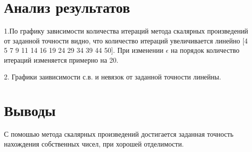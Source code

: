 \documentclass{article}
\begin{document}
	
	\section{Анализ результатов}
	1.По графику зависимости количества итераций метода скалярных произведений от заданной точности видно, что количество итераций увеличивается линейно [4 5 7 9 11 14 16 19 24 29 34 39 44 50].
	При изменении $\epsilon$ на порядок количество итераций изменяется примерно на 20. 
	
	2. Графики заивисимости с.в. и невязок от заданной точности линейны.
	
	
	\section{Выводы}
	С помошью метода скалярных произведений достигается заданная точность нахождения собственных чисел, при хорошей отделимости.
	
\end{document}
